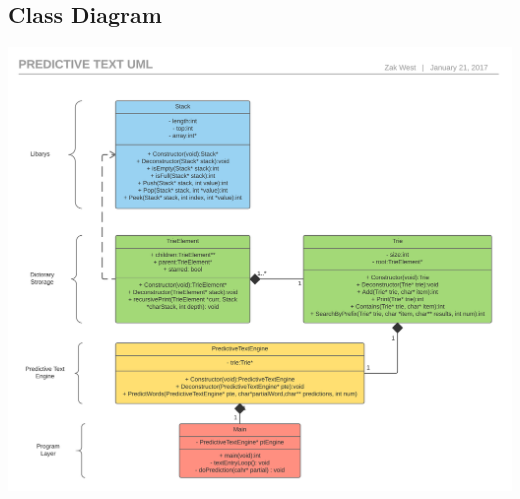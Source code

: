 \documentclass[10pt]{article} %
\begin{document}
    \subsection{Class Diagram}
        \includegraphics[width=\textwidth]{PredictiveTextUML}
\end{document}
